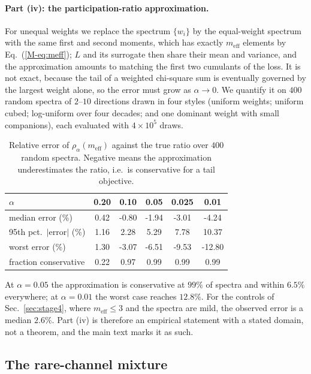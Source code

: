 \documentclass[aps,pra,onecolumn,notitlepage,superscriptaddress,nofootinbib,floatfix]{revtex4-2}
\begin{document}
\paragraph*{Part (iv): the participation-ratio approximation.} For unequal
weights we replace the spectrum $\{w_i\}$ by the equal-weight spectrum with
the same first and second moments, which has exactly $m_{\mathrm{eff}}$
elements by Eq.~(\ref{M-eq:meff}); $L$ and its surrogate then share their mean
and variance, and the approximation amounts to matching the first two
cumulants of the loss. It is not exact, because the tail of a weighted
chi-square sum is eventually governed by the largest weight alone, so the
error must grow as $\alpha\to0$. We quantify it on $400$ random spectra of
$2$--$10$ directions drawn in four styles (uniform weights; uniform cubed;
log-uniform over four decades; and one dominant weight with small companions),
each evaluated with $4\times10^5$ draws.

\begin{table}[h]
\caption{Relative error of $\rho_\alpha(m_{\mathrm{eff}})$ against the true
ratio over $400$ random spectra. Negative means the approximation
underestimates the ratio, i.e.\ is conservative for a tail objective.}
\label{tab:prop5acc}
\begin{ruledtabular}
\begin{tabular}{lccccc}
$\alpha$ & 0.20 & 0.10 & 0.05 & 0.025 & 0.01\\
\hline
median error (\%) & 0.42 & -0.80 & -1.94 & -3.01 & -4.24\\
95th pct.\ $|$error$|$ (\%) & 1.16 & 2.28 & 5.29 & 7.78 & 10.37\\
worst error (\%) & 1.30 & -3.07 & -6.51 & -9.53 & -12.80\\
fraction conservative & 0.22 & 0.97 & 0.99 & 0.99 & 0.99\\
\end{tabular}
\end{ruledtabular}
\end{table}

At $\alpha=0.05$ the approximation is conservative at $99\%$ of spectra and
within $6.5\%$ everywhere; at $\alpha=0.01$ the worst case reaches $12.8\%$.
For the controls of Sec.~\ref{sec:stage4}, where $m_{\mathrm{eff}}\le3$ and the
spectra are mild, the observed error is a median $2.6\%$. Part (iv) is
therefore an empirical statement with a stated domain, not a theorem, and the
main text marks it as such.

\subsection{The rare-channel mixture}
\label{sec:proofs-mixture}
\end{document}
